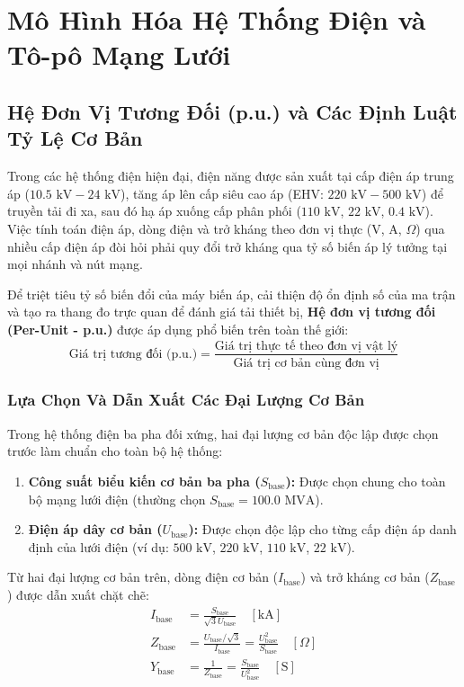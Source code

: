 \documentclass[12pt,a4paper,oneside]{report}
\begin{document}
\chapter{Mô Hình Hóa Hệ Thống Điện và Tô-pô Mạng Lưới}

\section{Hệ Đơn Vị Tương Đối (p.u.) và Các Định Luật Tỷ Lệ Cơ Bản}
Trong các hệ thống điện hiện đại, điện năng được sản xuất tại cấp điện áp trung áp ($10.5\text{ kV} - 24\text{ kV}$), tăng áp lên cấp siêu cao áp (EHV: $220\text{ kV} - 500\text{ kV}$) để truyền tải đi xa, sau đó hạ áp xuống cấp phân phối ($110\text{ kV}$, $22\text{ kV}$, $0.4\text{ kV}$). Việc tính toán điện áp, dòng điện và trở kháng theo đơn vị thực (V, A, $\Omega$) qua nhiều cấp điện áp đòi hỏi phải quy đổi trở kháng qua tỷ số biến áp lý tưởng tại mọi nhánh và nút mạng.

Để triệt tiêu tỷ số biến đổi của máy biến áp, cải thiện độ ổn định số của ma trận và tạo ra thang đo trực quan để đánh giá tải thiết bị, \textbf{Hệ đơn vị tương đối (Per-Unit - p.u.)} được áp dụng phổ biến trên toàn thế giới:
\begin{equation}
\text{Giá trị tương đối (p.u.)} = \frac{\text{Giá trị thực tế theo đơn vị vật lý}}{\text{Giá trị cơ bản cùng đơn vị}}
\end{equation}

\subsection{Lựa Chọn Và Dẫn Xuất Các Đại Lượng Cơ Bản}
Trong hệ thống điện ba pha đối xứng, hai đại lượng cơ bản độc lập được chọn trước làm chuẩn cho toàn bộ hệ thống:
\begin{enumerate}
    \item \textbf{Công suất biểu kiến cơ bản ba pha ($S_{\text{base}}$):} Được chọn chung cho toàn bộ mạng lưới điện (thường chọn $S_{\text{base}} = 100.0\text{ MVA}$).
    \item \textbf{Điện áp dây cơ bản ($U_{\text{base}}$):} Được chọn độc lập cho từng cấp điện áp danh định của lưới điện (ví dụ: $500\text{ kV}$, $220\text{ kV}$, $110\text{ kV}$, $22\text{ kV}$).
\end{enumerate}

Từ hai đại lượng cơ bản trên, dòng điện cơ bản ($I_{\text{base}}$) và trở kháng cơ bản ($Z_{\text{base}}$) được dẫn xuất chặt chẽ:
\begin{align}
I_{\text{base}} &= \frac{S_{\text{base}}}{\sqrt{3} U_{\text{base}}} \quad [\text{kA}] \\
Z_{\text{base}} &= \frac{U_{\text{base}} / \sqrt{3}}{I_{\text{base}}} = \frac{U_{\text{base}}^2}{S_{\text{base}}} \quad [\Omega] \\
Y_{\text{base}} &= \frac{1}{Z_{\text{base}}} = \frac{S_{\text{base}}}{U_{\text{base}}^2} \quad [\text{S}]
\end{align}
\end{document}
